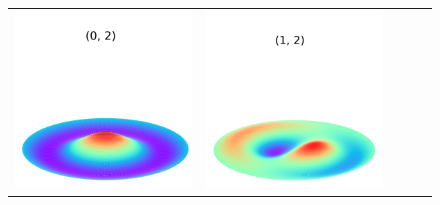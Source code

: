 \documentclass[a4paper]{ctexart}
\begin{document}
\begin{figure}[htbp]
\begin{tabular}{ccccc}
			\includegraphics[scale=0.4]{0_2.png} & \includegraphics[scale=0.4]{1_2.png}

\end{tabular}
\end{figure}
\end{document}
